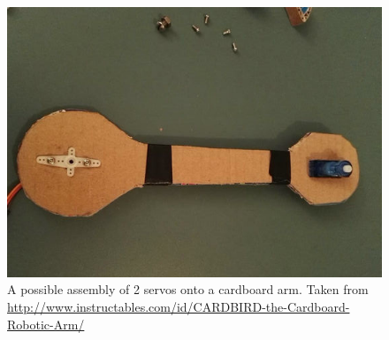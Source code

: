 \documentclass{instructions}
\begin{document}
\begin{figure}[h!]
    \centering
    \includegraphics[width=0.9\linewidth]{figs/arm-cardboard}
    \caption{A possible assembly of 2 servos onto a cardboard arm. Taken from
    \url{http://www.instructables.com/id/CARDBIRD-the-Cardboard-Robotic-Arm/}}
    \label{}
\end{figure}




\end{document}
